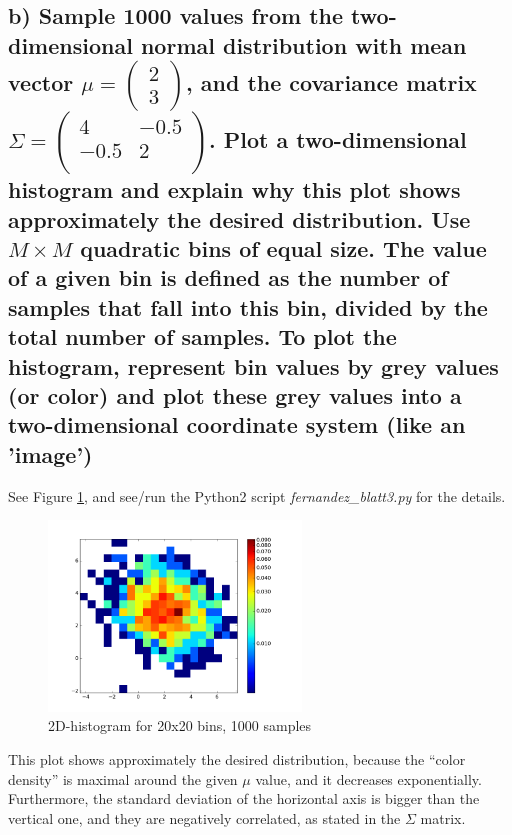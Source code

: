 \documentclass[11pt]{scrartcl} %
\begin{document}
         \subsection*{b) Sample 1000 values from the two-dimensional normal distribution with mean vector \(\mu= \begin{pmatrix} 2 \\ 3 \end{pmatrix}\), and the covariance matrix \(\Sigma = \begin{pmatrix}
             4 &  -0.5 \\-0.5 & 2 \\\end{pmatrix}\). Plot a two-dimensional histogram and explain why this plot shows approximately the desired distribution. Use \(M\times M\) quadratic bins of equal size. The value of a given bin is defined as the number of samples that fall into this bin, divided by the total number of samples. To plot the histogram, represent bin values by grey values (or color) and plot these grey values into a two-dimensional coordinate system (like an 'image')}
         See Figure \ref{fig2}, and see/run the Python2 script {\it fernandez\_blatt3.py} for the details. 
         \begin{figure}[ht]
	   \centering
           \includegraphics[width=0.6\textwidth, angle=0]{multivar_1.png}
	   \caption{2D-histogram for 20x20 bins, 1000 samples}
	   \label{fig2}
         \end{figure}
         This plot shows approximately the desired distribution, because the ``color density'' is maximal around the given \(\mu\) value, and it decreases exponentially. Furthermore, the standard deviation of the horizontal axis is bigger than the vertical one, and they are negatively correlated, as stated in the \(\Sigma\) matrix.
\end{document}
